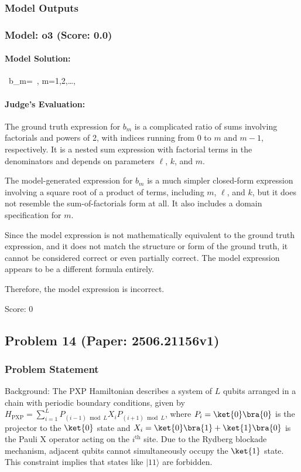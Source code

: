 \documentclass[10pt]{article}
\begin{document}
\subsubsection*{Model Outputs}
\subsubsection*{Model: o3 (Score: 0.0)}
\paragraph*{Model Solution:}
\, b_{m}= \,,\quad 
          m=1,2,\dots ,\,

\paragraph*{Judge's Evaluation:}

The ground truth expression for \( b_m \) is a complicated ratio of sums involving factorials and powers of 2, with indices running from 0 to \( m \) and \( m-1 \), respectively. It is a nested sum expression with factorial terms in the denominators and depends on parameters \( \ell \), \( k \), and \( m \).

The model-generated expression for \( b_m \) is a much simpler closed-form expression involving a square root of a product of terms, including \( m \), \( \ell \), and \( k \), but it does not resemble the sum-of-factorials form at all. It also includes a domain specification for \( m \).

Since the model expression is not mathematically equivalent to the ground truth expression, and it does not match the structure or form of the ground truth, it cannot be considered correct or even partially correct. The model expression appears to be a different formula entirely.

Therefore, the model expression is incorrect.

Score: 0

\newpage
\subsection*{Problem 14 (Paper: 2506.21156v1)}
\subsubsection*{Problem Statement}
Background:
The PXP Hamiltonian describes a system of $L$ qubits arranged in a chain with periodic boundary conditions, given by $H_{\text{PXP}} = \sum_{i=1}^L P_{(i-1) \bmod L}X_{i}P_{(i+1) \bmod L}$, where $P_i = \ket{0}\bra{0}$ is the projector to the $\ket{0}$ state and $X_i=\ket{0}\bra{1}+\ket{1}\bra{0}$ is the Pauli X operator acting on the $i^{\text{th}}$ site. Due to the Rydberg blockade mechanism, adjacent qubits cannot simultaneously occupy the $\ket{1}$ state. This constraint implies that states like $|11\rangle$ are forbidden.
\end{document}
